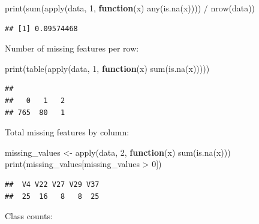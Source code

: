 \documentclass[
]{article}
\newenvironment{Shaded}{\begin{snugshade}}{\end{snugshade}}
\newcommand{\ControlFlowTok}[1]{\textcolor[rgb]{0.13,0.29,0.53}{\textbf{#1}}}
\newcommand{\DecValTok}[1]{\textcolor[rgb]{0.00,0.00,0.81}{#1}}
\newcommand{\FunctionTok}[1]{\textcolor[rgb]{0.00,0.00,0.00}{#1}}
\newcommand{\NormalTok}[1]{#1}
\newcommand{\OtherTok}[1]{\textcolor[rgb]{0.56,0.35,0.01}{#1}}
\newcommand{\SpecialCharTok}[1]{\textcolor[rgb]{0.00,0.00,0.00}{#1}}
\begin{document}
\begin{Shaded}
\begin{Highlighting}[]
\FunctionTok{print}\NormalTok{(}\FunctionTok{sum}\NormalTok{(}\FunctionTok{apply}\NormalTok{(data, }\DecValTok{1}\NormalTok{, }\ControlFlowTok{function}\NormalTok{(x) }\FunctionTok{any}\NormalTok{(}\FunctionTok{is.na}\NormalTok{(x)))) }\SpecialCharTok{/} \FunctionTok{nrow}\NormalTok{(data))}
\end{Highlighting}
\end{Shaded}

\begin{verbatim}
## [1] 0.09574468
\end{verbatim}

Number of missing features per row:

\begin{Shaded}
\begin{Highlighting}[]
\FunctionTok{print}\NormalTok{(}\FunctionTok{table}\NormalTok{(}\FunctionTok{apply}\NormalTok{(data, }\DecValTok{1}\NormalTok{, }\ControlFlowTok{function}\NormalTok{(x) }\FunctionTok{sum}\NormalTok{(}\FunctionTok{is.na}\NormalTok{(x)))))}
\end{Highlighting}
\end{Shaded}

\begin{verbatim}
## 
##   0   1   2 
## 765  80   1
\end{verbatim}

Total missing features by column:

\begin{Shaded}
\begin{Highlighting}[]
\NormalTok{missing\_values }\OtherTok{\textless{}{-}} \FunctionTok{apply}\NormalTok{(data, }\DecValTok{2}\NormalTok{, }\ControlFlowTok{function}\NormalTok{(x) }\FunctionTok{sum}\NormalTok{(}\FunctionTok{is.na}\NormalTok{(x)))}
\FunctionTok{print}\NormalTok{(missing\_values[missing\_values }\SpecialCharTok{\textgreater{}} \DecValTok{0}\NormalTok{])}
\end{Highlighting}
\end{Shaded}

\begin{verbatim}
##  V4 V22 V27 V29 V37 
##  25  16   8   8  25
\end{verbatim}

Class counts:

\begin{Shaded}
\end{Shaded}
\end{document}
